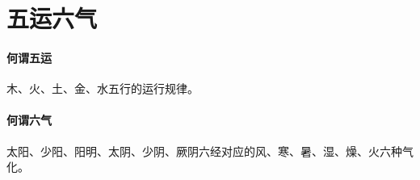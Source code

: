 \section{五运六气}

\paragraph{何谓五运}
木、火、土、金、水五行的运行规律。

\paragraph{何谓六气}
太阳、少阳、阳明、太阴、少阴、厥阴六经对应的风、寒、暑、湿、燥、火六种气化。
